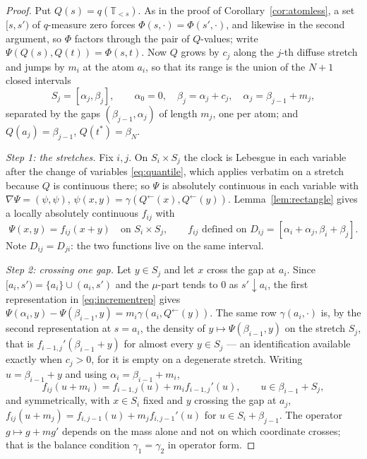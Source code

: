 \documentclass[11pt,a4paper]{article}
\theoremstyle{plain}
\theoremstyle{definition}
\theoremstyle{remark}
\newcommand{\T}{\mathbb{T}}                     %
\begin{document}
\begin{proof}
  Put $Q(s) = q(\T_{<s})$.  As in the proof of Corollary~\ref{cor:atomless}, a
  set $[s,s')$ of $q$-measure zero forces $\Phi(s,\cdot) = \Phi(s',\cdot)$, and
  likewise in the second argument, so $\Phi$ factors through the pair of
  $Q$-values; write $\Psi(Q(s),Q(t)) = \Phi(s,t)$.  Now $Q$ grows by $c_j$ along
  the $j$-th diffuse stretch and jumps by $m_i$ at the atom $a_i$, so that its
  range is the union of the $N+1$ closed intervals
  \[
    S_j = [\alpha_j, \beta_j], \qquad
    \alpha_0 = 0, \quad \beta_j = \alpha_j + c_j, \quad
    \alpha_j = \beta_{j-1} + m_j ,
  \]
  separated by the gaps $(\beta_{j-1}, \alpha_j)$ of length $m_j$, one per atom;
  and $Q(a_j) = \beta_{j-1}$, $Q(t^*) = \beta_N$.

  \emph{Step 1: the stretches.}  Fix $i,j$.  On $S_i \times S_j$ the clock is
  Lebesgue in each variable after the change of variables \eqref{eq:quantile},
  which applies verbatim on a stretch because $Q$ is continuous there; so $\Psi$
  is absolutely continuous in each variable with
  $\nabla \Psi = (\psi,\psi)$, $\psi(x,y) = \gamma(Q^{\leftarrow}(x),Q^{\leftarrow}(y))$.
  Lemma~\ref{lem:rectangle} gives a locally absolutely continuous $f_{ij}$ with
  \[
    \Psi(x,y) = f_{ij}(x+y) \quad \text{on } S_i \times S_j , \qquad
    f_{ij} \text{ defined on } D_{ij} = [\alpha_i + \alpha_j, \beta_i + \beta_j] .
  \]
  Note $D_{ij} = D_{ji}$: the two functions live on the same interval.

  \emph{Step 2: crossing one gap.}  Let $y \in S_j$ and let $x$ cross the gap at
  $a_i$.  Since $[a_i,s') = \{a_i\} \cup (a_i,s')$ and the $\mu$-part tends to
  $0$ as $s' \downarrow a_i$, the first representation in
  \eqref{eq:incrementrep} gives
  $\Psi(\alpha_i,y) - \Psi(\beta_{i-1},y) = m_i \gamma(a_i,Q^{\leftarrow}(y))$.
  The same row $\gamma(a_i,\cdot)$ is, by the second representation at
  $s = a_i$, the density of $y \mapsto \Psi(\beta_{i-1},y)$ on the stretch $S_j$,
  that is $f_{i-1,j}'(\beta_{i-1}+y)$ for almost every $y \in S_j$ --- an
  identification available exactly when $c_j > 0$, for it is empty on a
  degenerate stretch.  Writing $u = \beta_{i-1} + y$ and using
  $\alpha_i = \beta_{i-1} + m_i$,
  \begin{equation}
    \label{eq:mixcross}
    f_{ij}(u + m_i) = f_{i-1,j}(u) + m_i f_{i-1,j}'(u) ,
    \qquad u \in \beta_{i-1} + S_j ,
  \end{equation}
  and symmetrically, with $x \in S_i$ fixed and $y$ crossing the gap at $a_j$,
  $f_{ij}(u+m_j) = f_{i,j-1}(u) + m_j f_{i,j-1}'(u)$ for $u \in S_i + \beta_{j-1}$.
  The operator $g \mapsto g + m g'$ depends on the mass alone and not on which
  coordinate crosses; that is the balance condition $\gamma_1 = \gamma_2$ in
  operator form.


\end{proof}
\end{document}

